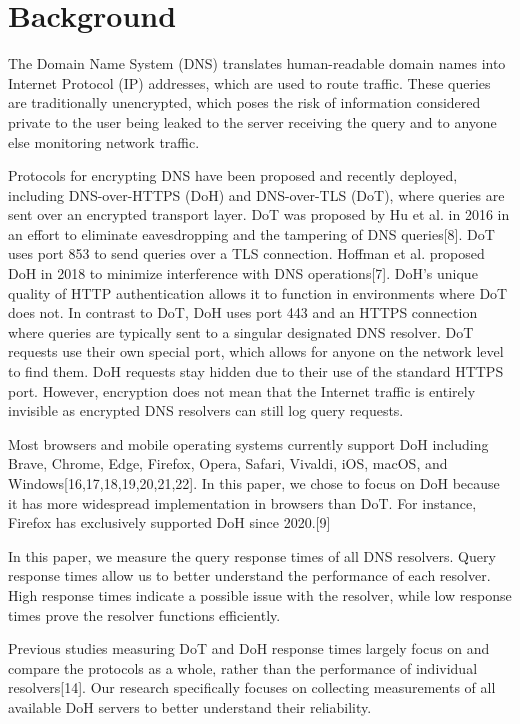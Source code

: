 \section{Background}\label{sec:back}

The Domain Name System (DNS) translates human-readable domain names into Internet Protocol (IP) addresses, which are used to route traffic.
These queries are traditionally unencrypted, which poses the risk of information considered private to the user being leaked to the server receiving the query and to anyone else monitoring network traffic. 

Protocols for encrypting DNS have been proposed and recently deployed, including DNS-over-HTTPS (DoH) and DNS-over-TLS (DoT), where queries are sent over an encrypted transport layer.
DoT was proposed by Hu et al. in 2016 in an effort to eliminate eavesdropping and the tampering of DNS queries[8].
DoT uses port 853 to send queries over a TLS connection.
Hoffman et al. proposed DoH in 2018 to minimize interference with DNS operations[7].
DoH's unique quality of HTTP authentication allows it to function in environments where DoT does not.
In contrast to DoT, DoH uses port 443 and an HTTPS connection where queries are typically sent to a singular designated DNS resolver.
DoT requests use their own special port, which allows for anyone on the network level to find them.
DoH requests stay hidden due to their use of the standard HTTPS port.
However, encryption does not mean that the Internet traffic is entirely invisible as encrypted DNS resolvers can still log query requests.

Most browsers and mobile operating systems currently support DoH including Brave, Chrome, Edge, Firefox, Opera, Safari, Vivaldi, iOS, macOS, and Windows[16,17,18,19,20,21,22].
In this paper, we chose to focus on DoH because it has more widespread implementation in browsers than DoT.
For instance, Firefox has exclusively supported DoH since 2020.[9]

In this paper, we measure the query response times of all DNS resolvers.
Query response times allow us to better understand the performance of each resolver.
High response times indicate a possible issue with the resolver, while low response times prove the resolver functions efficiently.

Previous studies measuring DoT and DoH response times largely focus on and compare the protocols as a whole, rather than the performance of individual resolvers[14].
Our research specifically focuses on collecting measurements of all available DoH servers to better understand their reliability.
